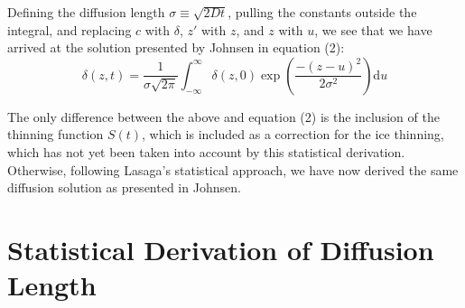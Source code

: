 \documentclass[draft, jgrga]{AGUTeX}
\begin{document}
\begin{article}
Defining the diffusion length \begin{math} \sigma \equiv \sqrt{2Dt} \end{math}, pulling the constants outside the integral, and replacing \begin{math} c \end{math} with \begin{math} \delta \end{math}, \begin{math} z' \end{math} with \begin{math} z \end{math}, and \begin{math} z \end{math} with \begin{math} u \end{math}, we see that we have arrived at the solution presented by Johnsen in equation (2):
\begin{equation}
\delta (z,t) = \frac{1}{\sigma \sqrt{2 \pi}}
\int^\infty_{-\infty} \delta (z,0) \exp \left(\frac{-(z-u)^2}{2 \sigma ^2} \right)
\mathrm{d}u
\end{equation}

The only difference between the above and equation (2) is the inclusion of the thinning function \begin{math} S(t) \end{math}, which is included as a correction for the ice thinning, which has not yet been taken into account by this statistical derivation. Otherwise, following Lasaga's statistical approach, we have now derived the same diffusion solution as presented in Johnsen.


\section{Statistical Derivation of Diffusion Length}


\end{article}
\end{document}
